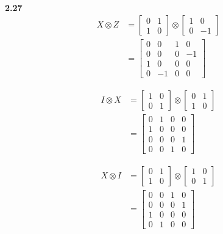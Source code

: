 \documentclass[10pt]{book}
\newcommand{\Textbf}[1]{\hspace{3mm}\\ \textbf{#1}\\}
\begin{document}
	
	\Textbf{2.27}
	\begin{equation}
\begin{aligned}
		X \otimes Z &= \begin{bmatrix}
			0 & 1 \\
			1 & 0
		\end{bmatrix}
		\otimes
		\begin{bmatrix}
			1 & 0 \\
			0 & -1
		\end{bmatrix} \\
		&= \begin{bmatrix}
			0 & 0 & 1 & 0 \\
			0 & 0 & 0 & -1 \\
			1 & 0 & 0 & 0 \\
			0 & -1 & 0 & 0
		\end{bmatrix}
	\end{aligned}
\end{equation}
	
	\begin{equation}
\begin{aligned}
		I \otimes X &= \begin{bmatrix}
			1 & 0 \\
			0 & 1
		\end{bmatrix}
		\otimes
		\begin{bmatrix}
			0 & 1 \\
			1 & 0
		\end{bmatrix}\\
		&=
		\begin{bmatrix}
			0 & 1 & 0 & 0 \\
			1 & 0 & 0 & 0 \\
			0 & 0 & 0 & 1 \\
			0 & 0 & 1 & 0
		\end{bmatrix}
	\end{aligned}
\end{equation}
	
	\begin{equation}
\begin{aligned}
		X \otimes I &= \begin{bmatrix}
			0 & 1 \\
			1 & 0
		\end{bmatrix}
		\otimes
		\begin{bmatrix}
			1 & 0 \\
			0 & 1
		\end{bmatrix}\\
		&= \begin{bmatrix}
			0 & 0 & 1 & 0 \\
			0 & 0 & 0 & 1 \\
			1 & 0 & 0 & 0 \\
			0 & 1 & 0 & 0
		\end{bmatrix}
	\end{aligned}
\end{equation}
	
\end{document}

